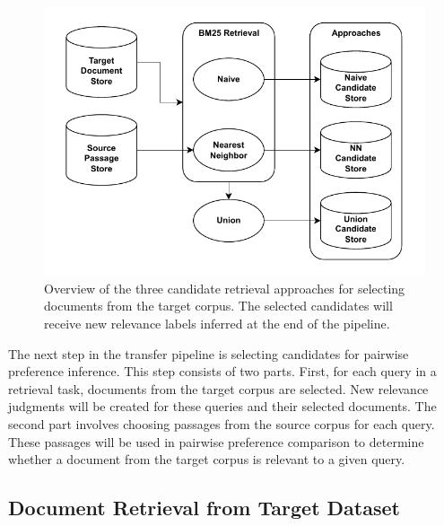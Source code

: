 \begin{figure}[t]
    \centering
    \includegraphics[width=\textwidth]{./graphics/drawio/candidate_selection.pdf}
    \caption{Overview of the three candidate retrieval approaches for selecting documents from the target corpus. The selected candidates will receive new relevance labels inferred at the end of the pipeline.}
\end{figure}

The next step in the transfer pipeline is selecting candidates for pairwise preference inference. This step consists of two parts. First, for each query in a retrieval task, documents from the target corpus are selected. New relevance judgments will be created for these queries and their selected documents. The second part involves choosing passages from the source corpus for each query. These passages will be used in pairwise preference comparison to determine whether a document from the target corpus is relevant to a given query.

\subsection{Document Retrieval from Target Dataset}\label{document-retrieval-from-target-dataset}

